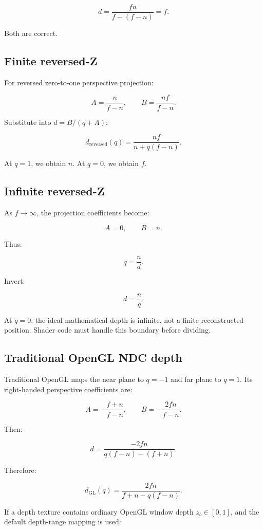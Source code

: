 \[ d=\frac{fn}{f-(f-n)}=f. \]

Both are correct.

\subsection{Finite reversed-Z}\label{02-foundations-ii-ch035-finite-reversed-z}

For reversed zero-to-one perspective projection:

\[ A=\frac n{f-n}, \qquad B=\frac{nf}{f-n}. \]

Substitute into \(d=B/(q+A)\):

\[ \boxed{ d_{\mathrm{reversed}}(q) = \frac{nf}{n+q(f-n)}. } \]

At \(q=1\), we obtain \(n\). At \(q=0\), we obtain \(f\).

\subsection{Infinite reversed-Z}\label{02-foundations-ii-ch035-infinite-reversed-z}

As \(f\to\infty\), the projection coefficients become:

\[ A=0,\qquad B=n. \]

Thus:

\[ q=\frac nd. \]

Invert:

\[ \boxed{ d=\frac nq. } \]

At \(q=0\), the ideal mathematical depth is infinite, not a finite reconstructed position. Shader code must handle this boundary before dividing.

\subsection{Traditional OpenGL NDC depth}\label{02-foundations-ii-ch035-traditional-opengl-ndc-depth}

Traditional OpenGL maps the near plane to \(q=-1\) and far plane to \(q=1\). Its right-handed perspective coefficients are:

\[ A=-\frac{f+n}{f-n}, \qquad B=-\frac{2fn}{f-n}. \]

Then:

\[ d= \frac{-2fn} {q(f-n)-(f+n)}. \]

Therefore:

\[ \boxed{ d_{\mathrm{GL}}(q)= \frac{2fn}{f+n-q(f-n)}. } \]

If a depth texture contains ordinary OpenGL window depth \(z_b\in[0,1]\), and the default depth-range mapping is used:

